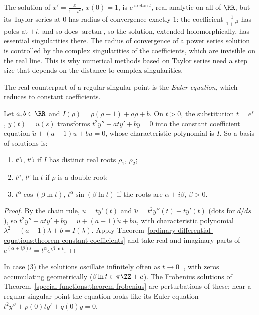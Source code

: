 \begin{example}\label{ordinary-differential-equations:example-radius}
The solution of $x' = \frac{x}{1 + t^2}$, $x(0) = 1$, is $e^{\arctan t}$, real analytic on all of $\RR$, but its Taylor series at $0$ has radius of convergence exactly $1$: the coefficient $\frac{1}{1 + t^2}$ has poles at $\pm i$, and so does
$\arctan$, so the solution, extended holomorphically, has essential singularities there. The radius of convergence of a power series solution is controlled by the complex singularities of the coefficients, which are invisible on
the real line. This is why numerical methods based on Taylor series need a step size that depends on the distance to complex singularities.
\end{example}

The real counterpart of a regular singular point is the \emph{Euler equation}, which reduces to constant coefficients.

\begin{proposition}\label{ordinary-differential-equations:proposition-euler-equation}
Let $a, b \in \RR$ and $I(\rho) = \rho(\rho - 1) + a\rho + b$. On $t > 0$, the substitution $t = e^s$, $y(t) = u(s)$ transforms $t^2y'' + aty' + by = 0$ into the constant coefficient equation $\ddot u + (a - 1)\dot u + bu = 0$, whose
characteristic polynomial is $I$. So a basis of solutions is:
\begin{enumerate}
\item $t^{\rho_1}$, $t^{\rho_2}$ if $I$ has distinct real roots $\rho_1$, $\rho_2$;
\item $t^\rho$, $t^\rho\ln t$ if $\rho$ is a double root;
\item $t^\alpha\cos(\beta\ln t)$, $t^\alpha\sin(\beta\ln t)$ if the roots are $\alpha \pm i\beta$, $\beta > 0$.
\end{enumerate}
\end{proposition}

\begin{proof}
By the chain rule, $\dot u = ty'(t)$ and $\ddot u = t^2y''(t) + ty'(t)$ (dots for $d/ds$), so $t^2y'' + aty' + by = \ddot u + (a - 1)\dot u + bu$, with characteristic polynomial $\lambda^2 + (a - 1)\lambda + b = I(\lambda)$. Apply
Theorem~\ref{ordinary-differential-equations:theorem-constant-coefficients} and take real and imaginary parts of $e^{(\alpha + i\beta)s} = t^\alpha e^{i\beta\ln t}$.
\end{proof}

In case (3) the solutions oscillate infinitely often as $t \to 0^+$, with zeros accumulating geometrically ($\beta\ln t \in \pi\ZZ + c$). The Frobenius solutions of Theorem~\ref{special-functions:theorem-frobenius} are perturbations of these:
near a regular singular point the equation looks like its Euler equation $t^2y'' + p(0)ty' + q(0)y = 0$.

